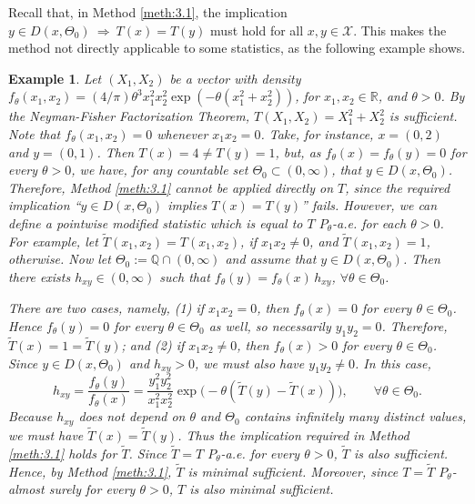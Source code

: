 \documentclass[12pt]{article}
\newtheorem{example}{Example}[section]
\begin{document}
Recall that, in Method \ref{meth:3.1}, the implication $y \in D(x,\Theta_0)\ \Longrightarrow\ T(x)=T(y)$ must hold for all $x,y \in \mathcal{X}$. This makes the method not directly applicable to some statistics, as the following example shows.
\begin{example} Let $(X_1,X_2)$ be a vector with density $f_\theta (x_1,x_2)= (4/\pi) \theta^3 x_1^2 x_2^2 \exp(-\theta(x_1^2 + x_2^2))$, for $x_1, x_2\in \mathbb{R}$, and $\theta>0$. By the Neyman-Fisher Factorization Theorem, $T(X_1,X_2) = X_1^2+X_2^2$ is sufficient. Note that $f_\theta(x_1,x_2)= 0$ whenever $x_1 x_2=0$. Take, for instance, $x=(0,2)$ and $y=(0,1)$. Then 
$T(x)=4 \neq T(y)=1$, but, as $f_\theta(x)=f_\theta(y)=0$ for every $\theta>0$, we have, for any countable set $\Theta_0\subset (0,\infty)$, that $y \in D(x,\Theta_0)$. Therefore, Method \ref{meth:3.1} cannot be applied directly on $T$, since the required implication  ``$y \in D(x, \Theta_0)$ implies $T(x) = T(y)$'' fails. However, we can define a pointwise modified statistic which is equal to $T$ $P_\theta$-a.e. for each $\theta>0$. For example, let $\tilde T(x_1,x_2) = T(x_1, x_2)$, if $x_1x_2 \neq 0$, and $\tilde T(x_1,x_2) = 1$, otherwise. Now let $\Theta _0:=\mathbb{Q}\cap (0,\infty )$ and assume that $y \in D(x, \Theta_0)$. Then there exists
$h_{xy} \in (0, \infty)$ such that
$f_\theta(y)=f_\theta(x)\,h_{xy}$, $\forall \theta\in\Theta_0$.

There are two cases, namely, (1) if $x_1x_2=0$, then $f_\theta(x)=0$ for every $\theta\in\Theta_0$. Hence $f_\theta(y)=0$ for every $\theta\in\Theta_0$ as well, so necessarily $y_1y_2=0$. Therefore, $\tilde T(x)=1=\tilde T(y)$; and (2) if $x_1x_2\neq0$, then $f_\theta(x)>0$ for every $\theta\in\Theta_0$. Since $y \in D(x,\Theta_0)$ and $h_{xy}>0$, we must also have $y_1y_2\neq0$. In this case,
\[
h_{xy} = \frac{f_\theta(y)}{f_\theta(x)}
= \frac{y_1^2 y_2^2}{x_1^2 x_2^2}
\exp\big(-\theta(\tilde T(y)-\tilde T(x))\big),
\qquad \forall \theta\in\Theta_0.
\]
Because $h_{xy}$ does not depend on $\theta$ and $\Theta_0$ contains infinitely many distinct values, we must have $\tilde T(x) = \tilde T(y)$. Thus the implication required in Method \ref{meth:3.1} holds for $\tilde T$. Since
$\tilde T=T$ $P_\theta$-a.e. for every $\theta>0$, $\tilde T$ is also sufficient.
Hence, by Method \ref{meth:3.1}, $\tilde T$ is minimal sufficient. Moreover, since
$T=\tilde T$ $P_\theta$-almost surely for every $\theta>0$, $T$ is also minimal sufficient.
\end{example}
\end{document}
